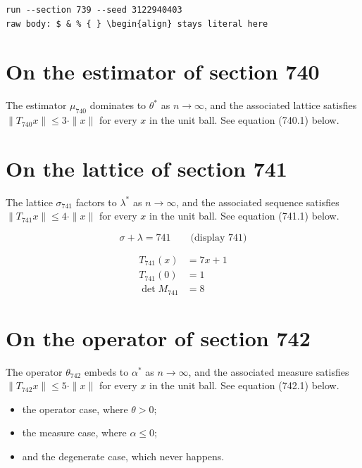 \documentclass{article}
\begin{document}
\begin{verbatim}
run --section 739 --seed 3122940403
raw body: $ & % { } \begin{align} stays literal here
\end{verbatim}

\section{On the estimator of section 740}
The estimator $\mu_{740}$ dominates to $\theta^{*}$ as $n \to \infty$,
and the associated lattice satisfies $\|T_{740} x\| \leq 3 \cdot \|x\|$
for every $x$ in the unit ball. See equation (740.1) below.

\section{On the lattice of section 741}
The lattice $\sigma_{741}$ factors to $\lambda^{*}$ as $n \to \infty$,
and the associated sequence satisfies $\|T_{741} x\| \leq 4 \cdot \|x\|$
for every $x$ in the unit ball. See equation (741.1) below.

$$
\sigma + \lambda = 741 \qquad \text{(display 741)}
$$

\begin{align}
T_{741}(x) &= 7 x + 1 \\
T_{741}(0) &= 1 \\
\det M_{741} &= 8
\end{align}

\section{On the operator of section 742}
The operator $\theta_{742}$ embeds to $\alpha^{*}$ as $n \to \infty$,
and the associated measure satisfies $\|T_{742} x\| \leq 5 \cdot \|x\|$
for every $x$ in the unit ball. See equation (742.1) below.

\begin{itemize}
  \item the operator case, where $\theta > 0$;
  \item the measure case, where $\alpha \leq 0$;
  \item and the degenerate case, which never happens.
\end{itemize}
\end{document}

